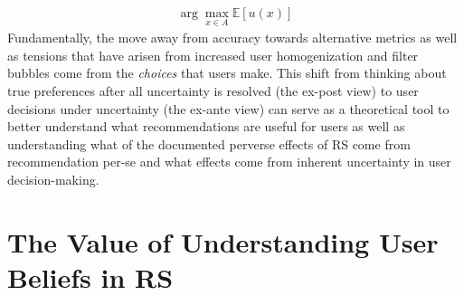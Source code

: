 \documentclass[sigconf]{acmart}
\begin{document}
\begin{align*}
\arg\max\limits_{x \in A} \mathbb{E}[u(x)]
\end{align*}
Fundamentally, the move away from accuracy towards alternative metrics as well as tensions that have arisen from increased user homogenization and filter bubbles come from the \textit{choices} that users make. This shift from thinking about true preferences after all uncertainty is resolved (the ex-post view) to user decisions under uncertainty (the ex-ante view) can serve as a theoretical tool to better understand what recommendations are useful for users as well as understanding what of the documented perverse effects of RS come from recommendation per-se and what effects come from inherent uncertainty in user decision-making.
\section{The Value of Understanding User Beliefs in RS}
\end{document}
